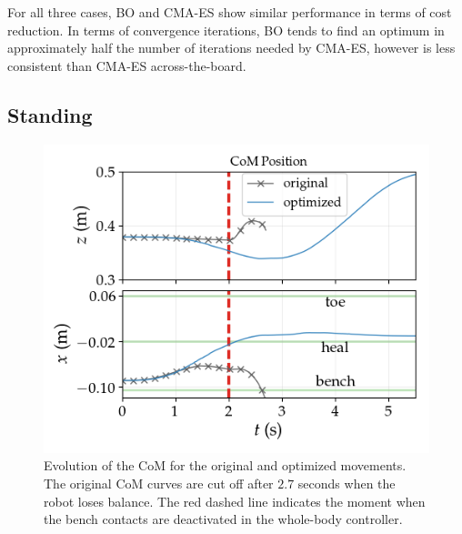 \documentclass[12pt,a4paper,twoside]{article}
\begin{document}
    For all three cases, BO and CMA-ES show similar performance in terms of cost reduction. In terms of convergence iterations, BO tends to find an optimum in approximately half the number of iterations needed by CMA-ES, however is less consistent than CMA-ES across-the-board.

\subsection{Standing}
\label{sec:results_standing}


\begin{figure}[!h]
	\begin{minipage}[c]{0.6\textwidth}
	\centering
    \includegraphics[width=\textwidth, trim={0cm 0.5cm 0cm 0cm}, clip]{standing/standing_traj}
  	\end{minipage}\hfill
  \begin{minipage}[c]{0.37\textwidth}
	\setlength{\belowcaptionskip}{-10pt}
    \caption{Evolution of the CoM for the original and optimized movements. The original CoM curves are cut off after $2.7$ seconds when the robot loses balance. The red dashed line indicates the moment when the bench contacts are deactivated in the whole-body controller.}
    \label{fig:standing_traj}
  \end{minipage}
\end{figure}
\end{document}
